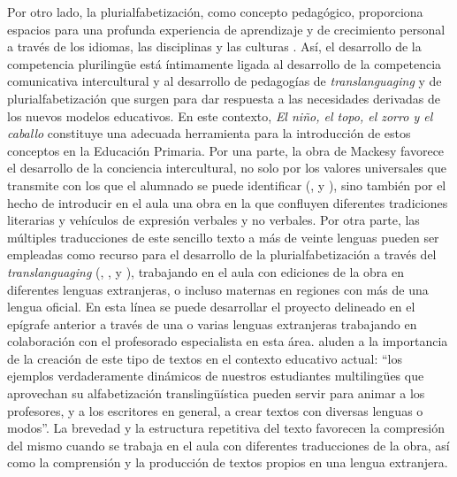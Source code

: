 \documentclass[spanish]{textolivre}
\begin{document}
Por otro lado, la plurialfabetización, como concepto pedagógico, proporciona espacios para una profunda experiencia de aprendizaje y de crecimiento personal a través de los idiomas, las disciplinas y las culturas \cite{coyle_exploring_2020}. Así, el desarrollo de la competencia plurilingüe está íntimamente ligada al desarrollo de la competencia comunicativa intercultural y al desarrollo de pedagogías de \textit{translanguaging} y de plurialfabetización que surgen para dar respuesta a las necesidades derivadas de los nuevos modelos educativos. En este contexto, \textit{El niño, el topo, el zorro y el caballo} constituye una adecuada herramienta para la introducción de estos conceptos en la Educación Primaria. Por una parte, la obra de Mackesy favorece el desarrollo de la conciencia intercultural, no solo por los valores universales que transmite con los que el alumnado se puede identificar (,  y ), sino también por el hecho de introducir en el aula una obra en la que confluyen diferentes tradiciones literarias y vehículos de expresión verbales y no verbales. Por otra parte, las múltiples traducciones de este sencillo texto a más de veinte lenguas pueden ser empleadas como recurso para el desarrollo de la plurialfabetización a través del \textit{translanguaging} (, ,  y ), trabajando en el aula con ediciones de la obra en diferentes lenguas extranjeras, o incluso maternas en regiones con más de una lengua oficial. En esta línea se puede desarrollar el proyecto delineado en el epígrafe anterior a través de una o varias lenguas extranjeras trabajando en colaboración con el profesorado especialista en esta área. \textcite[p. 167, Traducción de las autoras]{martinez_etxarri_translanguaging_2022} aluden a la importancia de la creación de este tipo de textos en el contexto educativo actual: “los ejemplos verdaderamente dinámicos de nuestros estudiantes multilingües que aprovechan su alfabetización translingüística pueden servir para animar a los profesores, y a los escritores en general, a crear textos con diversas lenguas o modos”.  La brevedad y la estructura repetitiva del texto favorecen la compresión del mismo cuando se trabaja en el aula con diferentes traducciones de la obra, así como la comprensión y la producción de textos propios en una lengua extranjera.
\end{document}
